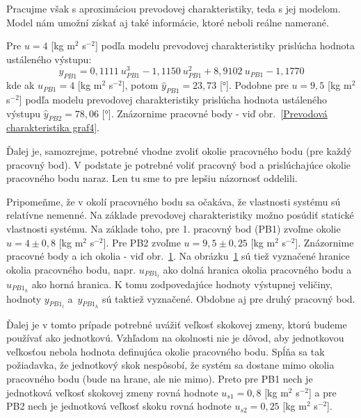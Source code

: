 \documentclass[a4paper, 10pt, ]{article}
\begin{document}
\bigskip

Pracujme však s aproximáciou prevodovej charakteristiky, teda s jej modelom. Model nám umožní získať aj také informácie, ktoré neboli reálne namerané.

Pre $u = 4$ [kg m$^2$ s$^{-2}$] podľa modelu prevodovej charakteristiky prislúcha hodnota ustáleného výstupu:
\begin{equation}
    \hat y_{PB1} = 0,1111\ u_{PB1}^3  -1,1150\ u_{PB1}^2 + 8,9102\ u_{PB1}  -1,1770
\end{equation}
kde ak $u_{PB1} = 4$ [kg m$^2$ s$^{-2}$], potom $\hat y_{PB1} = 23,73$ [°]. Podobne pre $u = 9,5$ [kg m$^2$ s$^{-2}$] podľa modelu prevodovej charakteristiky prislúcha hodnota ustáleného výstupu $\hat y_{PB2} = 78,06$ [°]. Znázornime pracovné body - viď obr.~\ref{Prevodová charakteristika graf4}.


Ďalej je, samozrejme, potrebné vhodne zvoliť okolie pracovného bodu (pre každý pracovný bod). V podstate je potrebné voliť pracovný bod a prislúchajúce okolie pracovného bodu naraz. Len tu sme to pre lepšiu názornosť oddelili.

Pripomeňme, že v okolí pracovného bodu sa očakáva, že vlastnosti systému sú relatívne nemenné. Na základe prevodovej charakteristiky možno posúdiť statické vlastnosti systému. Na základe toho, pre 1. pracovný bod (PB1) zvoľme okolie $u = 4 \pm 0,8$ [kg m$^2$ s$^{-2}$]. Pre PB2 zvoľme $u = 9,5 \pm 0,25$ [kg m$^2$ s$^{-2}$]. Znázornime pracovné body a ich okolia - viď obr.~\ref{Prevodová charakteristika graf5}. Na obrázku~\ref{Prevodová charakteristika graf5} sú tiež vyznačené hranice okolia pracovného bodu, napr. $u_{PB1_l}$ ako dolná hranica okolia pracovného bodu a~$u_{PB1_h}$ ako horná hranica. K tomu zodpovedajúce hodnoty výstupnej veličiny, hodnoty $y_{PB1_l}$ a~$y_{PB1_h}$ sú taktiež vyznačené. Obdobne aj pre druhý pracovný bod.


\begin{figure}[t]
	\centering


    \vspace{-4mm}

	\caption{}
	\label{Prevodová charakteristika graf5}

\end{figure}

Ďalej je v tomto prípade potrebné uvážiť veľkosť skokovej zmeny, ktorú budeme používať ako jednotkovú. Vzhľadom na okolnosti nie je dôvod, aby jednotkovou veľkosťou nebola hodnota definujúca okolie pracovného bodu. Spĺňa sa tak požiadavka, že jednotkový skok nespôsobí, že systém sa dostane mimo okolia pracovného bodu (bude na hrane, ale nie mimo). Preto pre PB1 nech je jednotková veľkosť skokovej zmeny rovná hodnote $u_{s1} = 0,8$ [kg m$^2$ s$^{-2}$] a pre PB2 nech je jednotková veľkosť skoku rovná hodnote $u_{s2} = 0,25$ [kg m$^2$ s$^{-2}$].
\end{document}
